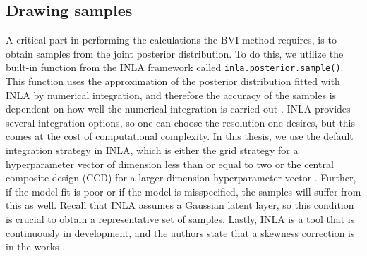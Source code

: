 \subsection{Drawing samples}
A critical part in performing the calculations the BVI method requires, is to obtain samples from the joint posterior distribution. To do this, we utilize the built-in function from the INLA framework called \texttt{inla.posterior.sample()}. This function uses the approximation of the posterior distribution fitted with INLA by numerical integration, and therefore the accuracy of the samples is dependent on how well the numerical integration is carried out \citep{gomezrubio2020inla}. INLA provides several integration options, so one can choose the resolution one desires, but this comes at the cost of computational complexity. In this thesis, we use the default integration strategy in INLA, which is either the grid strategy for a hyperparameter vector of dimension less than or equal to two or the central composite design (CCD) for a larger dimension hyperparameter vector \citep{martino2019inla}. Further, if the model fit is poor or if the model is misspecified, the samples will suffer from this as well. Recall that INLA assumes a Gaussian latent layer, so this condition is crucial to obtain a representative set of samples. Lastly, INLA is a tool that is continuously in development, and the authors state that a skewness correction is in the works \citep{gomezrubio2020inla}.  

